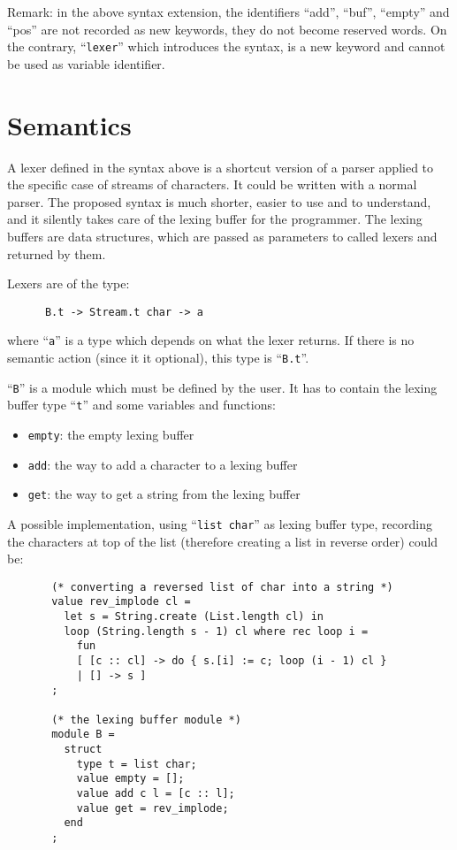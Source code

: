 \documentclass[11pt]{article}
\begin{document}
Remark: in the above syntax extension, the identifiers ``add'',
``buf'', ``empty'' and ``pos'' are not recorded as new keywords, they
do not become reserved words. On the contrary, ``\verb/lexer/'' which
introduces the syntax, is a new keyword and cannot be used as
variable identifier.

\section{Semantics}
\label{semantics}

A lexer defined in the syntax above is a shortcut version of a parser
applied to the specific case of streams of characters. It could be
written with a normal parser. The proposed syntax is much shorter,
easier to use and to understand, and it silently takes care of the
lexing buffer for the programmer. The lexing buffers are data
structures, which are passed as parameters to called lexers and
returned by them.

Lexers are of the type:

\begin{verbatim}
      B.t -> Stream.t char -> a
\end{verbatim}

where ``\verb/a/'' is a type which depends on what the lexer
returns. If there is no semantic action (since it it optional), this
type is ``\verb/B.t/''.

``\verb/B/'' is a module which must be defined by the user. It has to
contain the lexing buffer type ``\verb/t/'' and some variables and
functions:

\begin{itemize}
\item \verb/empty/: the empty lexing buffer
\item \verb/add/: the way to add a character to a lexing buffer
\item \verb/get/: the way to get a string from the lexing buffer
\end{itemize}

A possible implementation, using ``\verb/list char/'' as lexing buffer
type, recording the characters at top of the list (therefore creating
a list in reverse order) could be:

\begin{verbatim}
       (* converting a reversed list of char into a string *)
       value rev_implode cl =
         let s = String.create (List.length cl) in
         loop (String.length s - 1) cl where rec loop i =
           fun
           [ [c :: cl] -> do { s.[i] := c; loop (i - 1) cl }
           | [] -> s ]
       ;

       (* the lexing buffer module *)
       module B =
         struct
           type t = list char;
           value empty = [];
           value add c l = [c :: l];
           value get = rev_implode;
         end
       ;
\end{verbatim}
\end{document}
